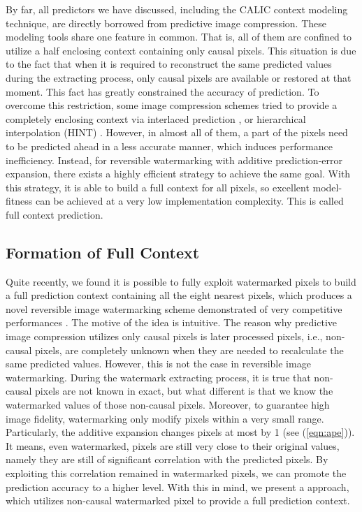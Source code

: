 \documentclass[journal]{IEEEtran}
\begin{document}
By far, all predictors we have discussed, including the CALIC context modeling technique, are
directly borrowed from predictive image compression. These modeling tools share one feature in common.
That is, all of them are confined to utilize a half enclosing context containing only causal pixels.
This situation is due to the fact that when it is required to reconstruct the same predicted values
during the extracting process, only causal pixels are available or restored at that moment. This
fact has greatly constrained the accuracy of prediction. To overcome this restriction, some image
compression schemes tried to provide a completely enclosing context via interlaced prediction
\cite{Wu97calic}, or hierarchical interpolation (HINT) \cite{Endoh86hint}. However, in almost all of
them, a part of the pixels need to be predicted ahead in a less accurate manner, which induces
performance inefficiency. Instead, for reversible watermarking with additive prediction-error
expansion, there exists a highly efficient strategy to achieve the same goal. With this strategy, it
is able to build a full context for all pixels, so excellent model-fitness can be achieved at a very
low implementation complexity. This is called full context prediction. 

\subsection{Formation of Full Context}

Quite recently, we found it is possible to fully exploit watermarked pixels to build a full
prediction context containing all the eight nearest pixels, which produces a novel reversible image
watermarking scheme demonstrated of very competitive performances \cite{Chen09full}. The motive of
the idea is intuitive. The reason why predictive image compression utilizes only causal pixels is
later processed pixels, i.e., non-causal pixels, are completely unknown when they are needed to
recalculate the same predicted values. However, this is not the case in reversible image
watermarking. During the watermark extracting process, it is true that non-causal pixels are not
known in exact, but what different is that we know the watermarked values of those non-causal
pixels. Moreover, to guarantee high image fidelity, watermarking only modify pixels within a very
small range. Particularly, the additive expansion changes pixels at most by 1 (see (\ref{eqn:ape})).
It means, even watermarked, pixels are still very close to their original values, namely they are
still of significant correlation with the predicted pixels. By exploiting this correlation remained
in watermarked pixels, we can promote the prediction accuracy to a higher level. With this in mind,
we present a approach, which utilizes non-causal watermarked pixel to provide a full prediction
context.
\end{document}

